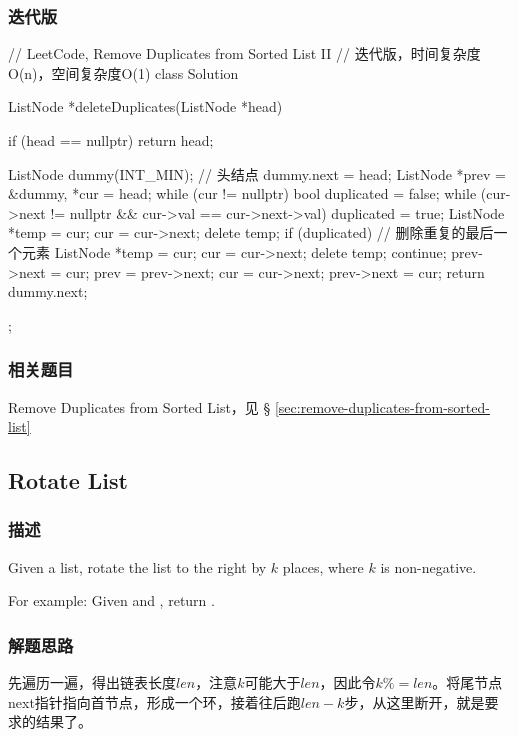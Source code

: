 \subsubsection{迭代版}
\begin{Code}
	// LeetCode, Remove Duplicates from Sorted List II
	// 迭代版，时间复杂度O(n)，空间复杂度O(1)
	class Solution {
		ListNode *deleteDuplicates(ListNode *head) {
			if (head == nullptr) return head;
			
			ListNode dummy(INT_MIN); // 头结点
			dummy.next = head;
			ListNode *prev = &dummy, *cur = head;
			while (cur != nullptr) {
				bool duplicated = false;
				while (cur->next != nullptr && cur->val == cur->next->val) {
					duplicated = true;
					ListNode *temp = cur;
					cur = cur->next;
					delete temp;
				}
				if (duplicated) { // 删除重复的最后一个元素
					ListNode *temp = cur;
					cur = cur->next;
					delete temp;
					continue;
				}
				prev->next = cur;
				prev = prev->next;
				cur = cur->next;
			}
			prev->next = cur;
			return dummy.next;
		}
	};
\end{Code}


\subsubsection{相关题目}

\begindot
\item Remove Duplicates from Sorted List，见 \S 
\ref{sec:remove-duplicates-from-sorted-list}
\myenddot


\subsection{Rotate List}
\label{sec:rotate-list}


\subsubsection{描述}
Given a list, rotate the list to the right by $k$ places, where $k$ is 
non-negative.

For example:
Given  and , return 
.


\subsubsection{解题思路}
先遍历一遍，得出链表长度$len$，注意$k$可能大于$len$，因此令$k \%= 
len$。将尾节点next指针指向首节点，形成一个环，接着往后跑$len-k$步，从这里断开，就是要求的结果了。



